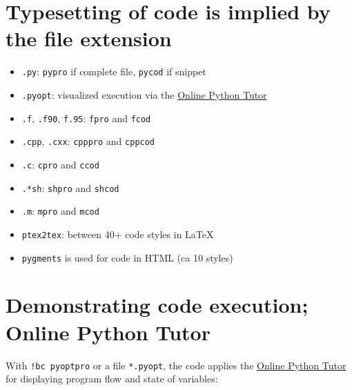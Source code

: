 \documentclass[%
twoside,                 %
final,                   %
chapterprefix=true,      %
open=right               %
10pt]{book}
\begin{document}
\section*{Typesetting of code is implied by the file extension}

\begin{itemize}
 \item \Verb!.py!: \Verb!pypro! if complete file, \Verb!pycod! if snippet

 \item \Verb!.pyopt!: visualized execution via the \href{{http://pythontutor.com}}{Online Python Tutor}

 \item \Verb!.f!, \Verb!.f90!, \Verb!f.95!: \Verb!fpro! and \Verb!fcod!

 \item \Verb!.cpp!, \Verb!.cxx!: \Verb!cpppro! and \Verb!cppcod!

 \item \Verb!.c!: \Verb!cpro! and \Verb!ccod!

 \item \Verb!.*sh!: \Verb!shpro! and \Verb!shcod!

 \item \Verb!.m!: \Verb!mpro! and \Verb!mcod!

 \item \Verb!ptex2tex!: between 40+ code styles in {\LaTeX}

 \item \Verb!pygments! is used for code in HTML (ca 10 styles)
\end{itemize}

\noindent
\section*{Demonstrating code execution; Online Python Tutor}
\label{slide:opt}

With \Verb~!bc pyoptpro~ or a file \Verb!*.pyopt!, the code applies the
\href{{http://pythontutor.com}}{Online Python Tutor} for displaying
program flow and state of variables:
\end{document}
